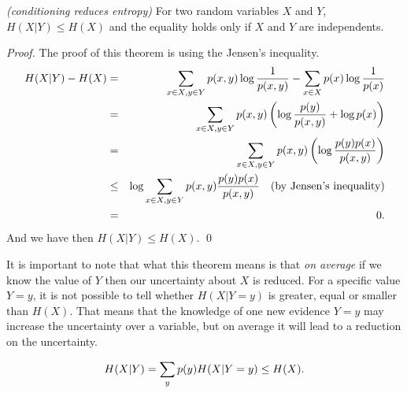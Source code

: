 \begin{theorem}
\emph{(conditioning reduces entropy)}
\label{conditioning-entropy}
For two random variables $X$ and $Y$, $H(X|Y) \leq H(X)$ and the equality holds only if $X$ and $Y$ are independents. 
\end{theorem}
\begin{proof}
The proof of this theorem is using the Jensen’s inequality.
\begin{eqnarray}
H(X|Y) - H(X) &=& \sum_{x \in X, y \in Y} p(x,y) \log \frac{1}{p(x,y)} - \sum_{x \in X} p(x) \log \frac{1}{p(x)} \nonumber \\
&=& \sum_{x \in X, y \in Y} p(x,y) \left(  \log \frac{p(y)}{p(x,y)} + \log p(x) \right) \nonumber \\
&=& \sum_{x \in X, y \in Y} p(x,y) \left( \log \frac{p(y)p(x)}{p(x,y)} \right) \nonumber \\
&\leq& \log \sum_{x \in X, y \in Y} p(x,y) \frac{p(y)p(x)}{p(x,y)} \textmd{ \ \ (by Jensen’s inequality)}\nonumber \\
&=& 0 \textmd{.}
\end{eqnarray}
And we have then $H(X|Y) \leq H(X)$. \qed
\end{proof}

\begin{remark}
It is important to note that what this theorem means is that \textit{on average} if we know the value of $Y$ then our
uncertainty about $X$ is reduced. For a specific value $Y=y$, it is not possible to tell whether $H(X|Y=y)$ is greater, 
equal or smaller than $H(X)$. That means that the knowledge of one new evidence $Y=y$ may increase the uncertainty over
a variable, but on average it will lead to a reduction on the uncertainty.

\begin{equation}
H(X|Y) = \sum_y p(y)H(X|Y=y) \leq H(X) \textmd{.}
\end{equation} 
\end{remark}





